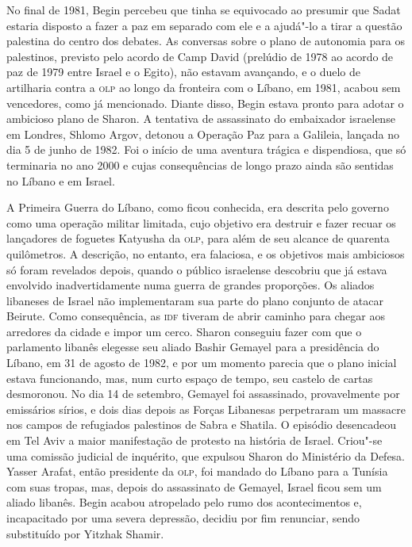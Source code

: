 No final de 1981, Begin percebeu que tinha se equivocado ao presumir que
Sadat estaria disposto a fazer a paz em separado com ele e a ajudá"-lo a
tirar a questão palestina do centro dos debates. As conversas sobre o
plano de autonomia para os palestinos, previsto pelo acordo de Camp
David (prelúdio de 1978 ao acordo de paz de 1979 entre Israel e o
Egito), não estavam avançando, e o duelo de artilharia contra a \textsc{olp} ao
longo da fronteira com o Líbano, em 1981, acabou sem vencedores, como já
mencionado. Diante disso, Begin estava pronto para adotar o ambicioso
plano de Sharon. A tentativa de assassinato do embaixador israelense em
Londres, Shlomo Argov, detonou a Operação Paz para a Galileia, lançada
no dia 5 de junho de 1982. Foi o início de uma aventura trágica e
dispendiosa, que só terminaria no ano 2000 e cujas consequências de
longo prazo ainda são sentidas no Líbano e em Israel.

A Primeira Guerra do Líbano, como ficou conhecida, era descrita pelo
governo como uma operação militar limitada, cujo objetivo era destruir e
fazer recuar os lançadores de foguetes Katyusha da \textsc{olp}, para além de seu
alcance de quarenta quilômetros. A descrição, no entanto, era falaciosa,
e os objetivos mais ambiciosos só foram revelados depois, quando o
público israelense descobriu que já estava envolvido inadvertidamente
numa guerra de grandes proporções. Os aliados libaneses de Israel não
implementaram sua parte do plano conjunto de atacar Beirute. Como
consequência, as \textsc{idf} tiveram de abrir caminho para chegar aos arredores
da cidade e impor um cerco. Sharon conseguiu fazer com que o parlamento
libanês elegesse seu aliado Bashir Gemayel para a presidência do Líbano,
em 31 de agosto de 1982, e por um momento parecia que o plano inicial
estava funcionando, mas, num curto espaço de tempo, seu castelo de cartas
desmoronou. No dia 14 de setembro, Gemayel foi assassinado,
provavelmente por emissários sírios, e dois dias depois as Forças
Libanesas perpetraram um massacre nos campos de refugiados palestinos de
Sabra e Shatila. O episódio desencadeou em Tel Aviv a maior manifestação de protesto
na história de Israel. Criou"-se uma comissão judicial de
inquérito, que expulsou Sharon do Ministério da Defesa. Yasser Arafat,
então presidente da \textsc{olp}, foi mandado do Líbano para a Tunísia com suas
tropas, mas, depois do assassinato de Gemayel, Israel ficou sem um aliado
libanês. Begin acabou atropelado pelo rumo dos acontecimentos e,
incapacitado por uma severa depressão, decidiu por fim renunciar, sendo
substituído por Yitzhak Shamir.

